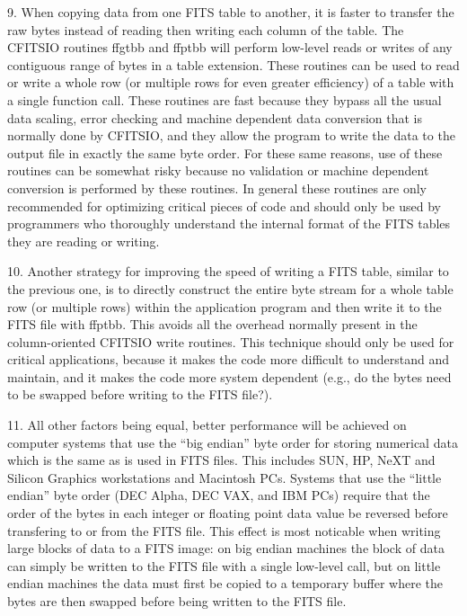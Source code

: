9. When copying data from one FITS table to another, it is faster to
transfer the raw bytes instead of reading then writing each column of
the table.  The CFITSIO routines ffgtbb and ffptbb will perform
low-level reads or writes of any contiguous range of bytes in a table
extension.  These routines can be used to read or write a whole row (or
multiple rows  for even greater efficiency) of a table with a single
function call.   These routines are fast because they bypass all the
usual data scaling, error checking and machine dependent data
conversion that is normally done by CFITSIO, and they allow the program
to write the data to the output file in exactly the same byte order.
For these same reasons, use of these routines can be somewhat risky
because no validation or machine dependent conversion is performed by
these routines.  In general these routines are only recommended for
optimizing critical pieces of code and should only be used by
programmers who thoroughly understand the internal format of the FITS
tables they are reading or writing.

10. Another strategy for improving the speed of writing a FITS table,
similar to the previous one, is to directly construct the entire byte
stream for a whole table row (or multiple rows) within the application
program and then write it to the FITS file with ffptbb.  This avoids
all the overhead normally present in the column-oriented CFITSIO write
routines.  This technique should only be used for critical
applications, because it makes the code more difficult to understand
and maintain, and it makes the code more system dependent (e.g., do the
bytes need to be swapped before writing to the FITS file?).

11.  All other factors being equal, better performance will be achieved
on computer systems that use the ``big endian'' byte order for storing
numerical data which is the same as is used in FITS files.  This
includes SUN, HP, NeXT and Silicon Graphics workstations and Macintosh
PCs.  Systems that use the ``little endian'' byte order (DEC Alpha, DEC
VAX, and IBM PCs) require that the order of the bytes in each integer
or floating point data value be reversed before transfering to or from
the FITS file.  This effect is most noticable when writing large blocks
of data to a FITS image:  on big endian machines the block of data can
simply be written to the FITS file with a single low-level call, but on
little endian machines the data must first be copied to a temporary
buffer where the bytes are then swapped before being written to the
FITS file.

